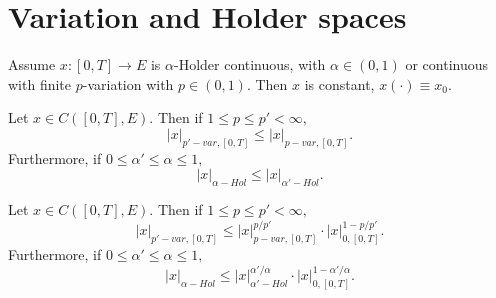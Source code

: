 \section{Variation and Holder spaces}

\begin{proposition}
    Assume $x: [0,T] \rightarrow E$ is $\alpha$-Holder continuous, with $\alpha \in (0,1)$ or continuous with finite $p$-variation with $p \in (0, 1).$
    Then $x$ is constant, $x(\cdot) \equiv x_0.$
\end{proposition}

\begin{proposition}
    Let $x \in C([0,T], E)$. Then if $1 \leq p \leq p' < \infty,$
    \begin{equation}
        |x|_{p'-var, [0,T]} \leq |x|_{p-var, [0,T]}. 
    \end{equation} 
    Furthermore, if $0 \leq \alpha' \leq \alpha \leq 1,$
    \begin{equation}
        |x|_{\alpha-Hol} \leq |x|_{\alpha'-Hol}.
    \end{equation}
\end{proposition}

\begin{proposition}[Interpolation]
        Let $x \in C([0,T], E)$. Then if $1 \leq p \leq p' < \infty,$
    \begin{equation}
        |x|_{p'-var, [0,T]} \leq |x|_{p-var, [0,T]}^{p/p'} \cdot |x|_{0,[0,T]}^{1 - p/p'}. 
    \end{equation} 
    Furthermore, if $0 \leq \alpha' \leq \alpha \leq 1,$
    \begin{equation}
        |x|_{\alpha-Hol} \leq |x|_{\alpha'-Hol}^{\alpha' / \alpha} \cdot |x|_{0,[0,T]}^{1 - \alpha' / \alpha}.
    \end{equation}
\end{proposition}

